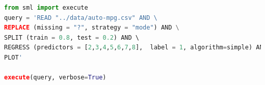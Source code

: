 \begin{lstlisting}[language=python,  caption={SML \(Query\) that performs regression on the Auto-MPG dataset using Linear Regression.}, label={lst:SML:AutoMPGQuery}]
from sml import execute
query = 'READ "../data/auto-mpg.csv" AND \ 
REPLACE (missing = "?", strategy = "mode") AND \
SPLIT (train = 0.8, test = 0.2) AND \ 
REGRESS (predictors = [2,3,4,5,6,7,8],  label = 1, algorithm=simple) AND \
PLOT'

execute(query, verbose=True)
\end{lstlisting}






%
%

